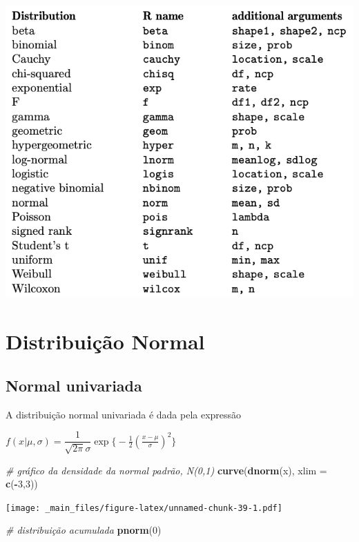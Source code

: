 \documentclass[
]{book}
\newenvironment{Shaded}{\begin{snugshade}}{\end{snugshade}}
\newcommand{\CommentTok}[1]{\textcolor[rgb]{0.56,0.35,0.01}{\textit{#1}}}
\newcommand{\DataTypeTok}[1]{\textcolor[rgb]{0.13,0.29,0.53}{#1}}
\newcommand{\DecValTok}[1]{\textcolor[rgb]{0.00,0.00,0.81}{#1}}
\newcommand{\KeywordTok}[1]{\textcolor[rgb]{0.13,0.29,0.53}{\textbf{#1}}}
\newcommand{\NormalTok}[1]{#1}
\newcommand{\OperatorTok}[1]{\textcolor[rgb]{0.81,0.36,0.00}{\textbf{#1}}}
\theoremstyle{definition}
\theoremstyle{definition}
\theoremstyle{definition}
\theoremstyle{remark}
\begin{document}
\includegraphics{img/probsR.png}

\hypertarget{distribuiuxe7uxe3o-normal}{%
\section{Distribuição Normal}\label{distribuiuxe7uxe3o-normal}}

\hypertarget{normal-univariada}{%
\subsection{Normal univariada}\label{normal-univariada}}

A distribuição normal univariada é dada pela expressão

\(f(x|\mu, \sigma) = \dfrac{1}{\sqrt{2\pi} \sigma} \exp \bigg\{ -\frac{1}{2} \left( \frac{x-\mu}{\sigma} \right) ^2 \bigg\}\)

\begin{Shaded}
\begin{Highlighting}[]
\CommentTok{\# gráfico da densidade da normal padrão, N(0,1)}
\KeywordTok{curve}\NormalTok{(}\KeywordTok{dnorm}\NormalTok{(x), }\DataTypeTok{xlim =} \KeywordTok{c}\NormalTok{(}\OperatorTok{{-}}\DecValTok{3}\NormalTok{,}\DecValTok{3}\NormalTok{))}
\end{Highlighting}
\end{Shaded}

\texttt{[image: \_main\_files/figure-latex/unnamed-chunk-39-1.pdf]}

\begin{Shaded}
\begin{Highlighting}[]
\CommentTok{\# distribuição acumulada}
\KeywordTok{pnorm}\NormalTok{(}\DecValTok{0}\NormalTok{)}
\end{Highlighting}
\end{Shaded}
\end{document}
